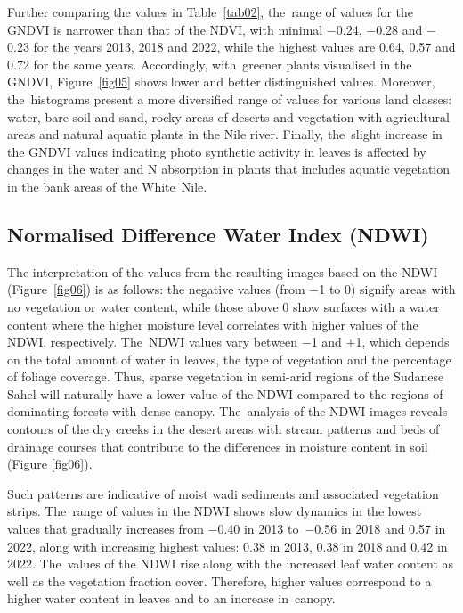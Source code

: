 \documentclass[jimaging,article,accept,pdftex,moreauthors]{Definitions/mdpi}
\begin{document}
Further comparing the values in Table~\ref{tab02}, the~range of values for the GNDVI is narrower than that of the NDVI, with minimal $-$0.24, $-$0.28 and $-$0.23 for the years 2013, 2018 and 2022, while the highest values are 0.64, 0.57 and 0.72 for the same years. Accordingly, with~greener plants visualised in the GNDVI, Figure~\ref{fig05} shows lower and better distinguished values. Moreover, the~histograms present a more diversified range of values for various land classes: water, bare soil and sand, rocky areas of deserts and vegetation with agricultural areas and natural aquatic plants in the Nile river. Finally, the~slight increase in the GNDVI values indicating photo synthetic activity in leaves is affected by changes in the water and N absorption in plants that includes aquatic vegetation in the bank areas of the White~Nile. 


\subsection{Normalised Difference Water Index (NDWI)}

The interpretation of the values from the resulting images based on the NDWI (Figure~\ref{fig06}) is as follows: the negative values (from $-$1  to 0) signify areas with no vegetation or water content, while those above 0 show surfaces with a water content where the higher moisture level correlates with higher values of the NDWI, respectively. The~NDWI values vary between $-$1 and +1, which depends on the total amount of water in leaves, the type of vegetation and the percentage of foliage coverage. Thus, sparse vegetation in semi-arid regions of the Sudanese Sahel will naturally have a lower value of the NDWI compared to the regions of dominating forests with dense canopy. The~analysis of the NDWI images reveals contours of the dry creeks in the desert areas with stream patterns and beds of drainage courses that contribute to the differences in moisture content in soil (Figure \ref{fig06}). 

Such patterns are indicative of moist wadi sediments and associated vegetation strips. The~range of values in the NDWI shows slow dynamics in the lowest values that gradually increases from $-$0.40 in 2013 to~$-$0.56 in 2018 and 0.57 in 2022, along with increasing highest values: 0.38 in 2013, 0.38 in 2018 and 0.42 in 2022. The~values of the NDWI rise along with the increased leaf water content as well as the vegetation fraction cover. Therefore, higher values correspond to a higher water content in leaves and to an increase in~canopy. 
\end{document}
